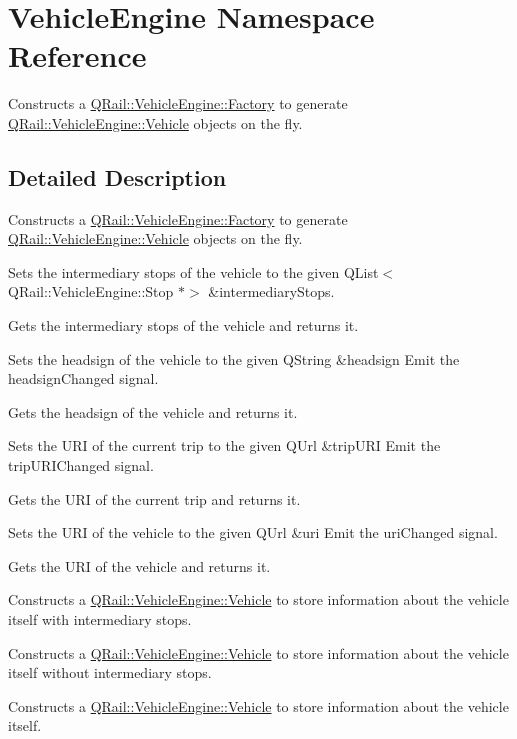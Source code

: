 \hypertarget{namespaceVehicleEngine}{}\section{Vehicle\+Engine Namespace Reference}
\label{namespaceVehicleEngine}


Constructs a \mbox{\hyperlink{classQRail_1_1VehicleEngine_1_1Factory}{Q\+Rail\+::\+Vehicle\+Engine\+::\+Factory}} to generate \mbox{\hyperlink{classQRail_1_1VehicleEngine_1_1Vehicle}{Q\+Rail\+::\+Vehicle\+Engine\+::\+Vehicle}} objects on the fly.  




\subsection{Detailed Description}
Constructs a \mbox{\hyperlink{classQRail_1_1VehicleEngine_1_1Factory}{Q\+Rail\+::\+Vehicle\+Engine\+::\+Factory}} to generate \mbox{\hyperlink{classQRail_1_1VehicleEngine_1_1Vehicle}{Q\+Rail\+::\+Vehicle\+Engine\+::\+Vehicle}} objects on the fly. 

Sets the intermediary stops of the vehicle to the given Q\+List$<$\+Q\+Rail\+::\+Vehicle\+Engine\+::\+Stop $\ast$$>$ \&intermediary\+Stops.

Gets the intermediary stops of the vehicle and returns it.

Sets the headsign of the vehicle to the given Q\+String \&headsign Emit the headsign\+Changed signal.

Gets the headsign of the vehicle and returns it.

Sets the U\+RI of the current trip to the given Q\+Url \&trip\+U\+RI Emit the trip\+U\+R\+I\+Changed signal.

Gets the U\+RI of the current trip and returns it.

Sets the U\+RI of the vehicle to the given Q\+Url \&uri Emit the uri\+Changed signal.

Gets the U\+RI of the vehicle and returns it.

Constructs a \mbox{\hyperlink{classQRail_1_1VehicleEngine_1_1Vehicle}{Q\+Rail\+::\+Vehicle\+Engine\+::\+Vehicle}} to store information about the vehicle itself with intermediary stops.

Constructs a \mbox{\hyperlink{classQRail_1_1VehicleEngine_1_1Vehicle}{Q\+Rail\+::\+Vehicle\+Engine\+::\+Vehicle}} to store information about the vehicle itself without intermediary stops.

Constructs a \mbox{\hyperlink{classQRail_1_1VehicleEngine_1_1Vehicle}{Q\+Rail\+::\+Vehicle\+Engine\+::\+Vehicle}} to store information about the vehicle itself.

